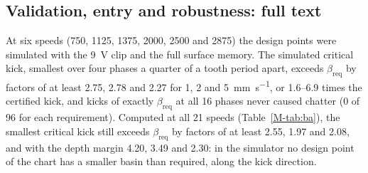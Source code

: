 
\subsection{Validation, entry and robustness: full text}\label{supp:std-ba-valid}

At six speeds (750, 1125, 1375, 2000, 2500 and \SI{2875}{\rpm}) the design points were simulated with the \SI{9}{\volt} clip and the full surface memory. The simulated critical kick, smallest over four phases a quarter of a tooth period apart, exceeds $\beta_{\mathrm{req}}$ by factors of at least 2.75, 2.78 and 2.27 for 1, 2 and \SI{5}{\milli\metre\per\second}, or 1.6--6.9 times the certified kick, and kicks of exactly $\beta_{\mathrm{req}}$ at all 16 phases never caused chatter (0 of 96 for each requirement). Computed at all 21 speeds (Table~\ref{M-tab:ba}), the smallest critical kick still exceeds $\beta_{\mathrm{req}}$ by factors of at least 2.55, 1.97 and 2.08, and with the depth margin 4.20, 3.49 and 2.30: in the simulator no design point of the chart has a smaller basin than required, along the kick direction.

